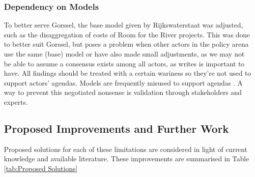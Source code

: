 \subsubsection{Dependency on Models}
To better serve Gorssel, the base model given by Rijkswaterstaat was adjusted, such as the disaggregation of costs of Room for the River projects. This was done to better suit Gorssel, but poses a problem when other actors in the policy arena use the same (base) model or have also made small adjustments, as we may not be able to assume a consensus exists among all actors, as \cite{kwakkel_coping_2016} writes is important to have. All findings should be treated with a certain wariness so they're not used to support actors' agendas. Models are frequently misused to support agendas \parencite{saltelli_five_2020}. A way to prevent this negotiated nonsense is validation through stakeholders and experts. 

\subsection{Proposed Improvements and Further Work}
Proposed solutions for each of these limitations are considered in light of current knowledge and available literature. These improvements are summarised in Table \ref{tab:Proposed Solutions}

